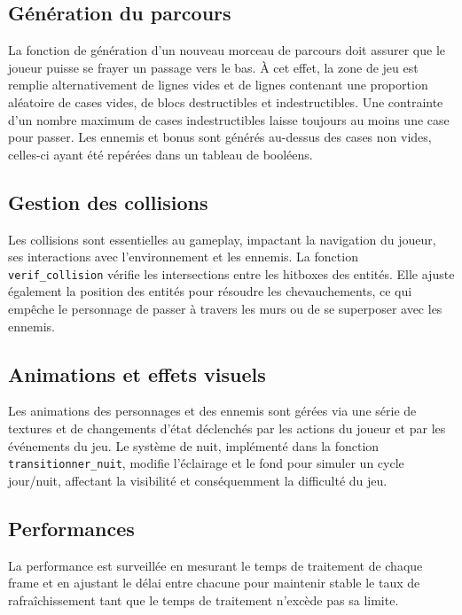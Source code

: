 \documentclass[a4paper,12pt]{article}
\begin{document}
\subsection{Génération du parcours}
La fonction de génération d’un nouveau morceau de parcours doit assurer que le joueur puisse se frayer un passage vers le bas.
À cet effet, la zone de jeu est remplie alternativement de lignes vides et de lignes contenant une proportion aléatoire de cases vides, de blocs destructibles et indestructibles.
Une contrainte d’un nombre maximum de cases indestructibles laisse toujours au moins une case pour passer.
Les ennemis et bonus sont générés au-dessus des cases non vides, celles-ci ayant été repérées dans un tableau de booléens.

\subsection{Gestion des collisions}

Les collisions sont essentielles au gameplay, impactant la navigation du joueur, ses interactions avec l'environnement et les ennemis. La fonction \texttt{verif\_collision} vérifie les intersections entre les hitboxes des entités. Elle ajuste également la position des entités pour résoudre les chevauchements, ce qui empêche le personnage de passer à travers les murs ou de se superposer avec les ennemis.

\subsection{Animations et effets visuels}

Les animations des personnages et des ennemis sont gérées via une série de textures et de changements d'état déclenchés par les actions du joueur et par les événements du jeu. Le système de nuit, implémenté dans la fonction \texttt{transitionner\_nuit}, modifie l'éclairage et le fond pour simuler un cycle jour/nuit, affectant la visibilité et conséquemment la difficulté du jeu.

\subsection{Performances}

La performance est surveillée en mesurant le temps de traitement de chaque frame et en ajustant le délai entre chacune pour maintenir stable le taux de rafraîchissement tant que le temps de traitement n’excède pas sa limite.
\end{document}
